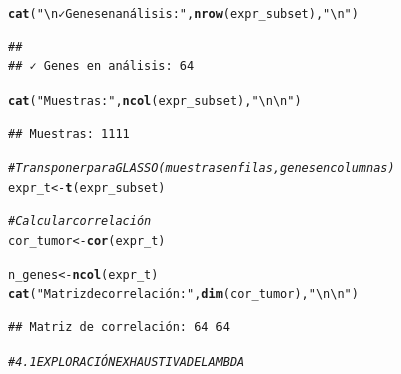 \documentclass{article}\usepackage[]{graphicx}\usepackage[]{xcolor}
\makeatletter
\newcommand{\hlsng}[1]{\textcolor[rgb]{0.192,0.494,0.8}{#1}}%
\newcommand{\hlcom}[1]{\textcolor[rgb]{0.678,0.584,0.686}{\textit{#1}}}%
\newcommand{\hldef}[1]{\textcolor[rgb]{0.345,0.345,0.345}{#1}}%
\newcommand{\hlkwb}[1]{\textcolor[rgb]{0.69,0.353,0.396}{#1}}%
\newcommand{\hlkwd}[1]{\textcolor[rgb]{0.737,0.353,0.396}{\textbf{#1}}}%
\newenvironment{kframe}{%
 \def\at@end@of@kframe{}%
 \ifinner\ifhmode%
  \def\at@end@of@kframe{\end{minipage}}%
  \begin{minipage}{\columnwidth}%
 \fi\fi%
 \def\FrameCommand##1{\hskip\@totalleftmargin \hskip-\fboxsep
 \colorbox{shadecolor}{##1}\hskip-\fboxsep
     \hskip-\linewidth \hskip-\@totalleftmargin \hskip\columnwidth}%
 \MakeFramed {\advance\hsize-\width
   \@totalleftmargin\z@ \linewidth\hsize
   \@setminipage}}%
 {\par\unskip\endMakeFramed%
 \at@end@of@kframe}
\newenvironment{knitrout}{}{} %
\makeatother
\begin{document}
\begin{knitrout}
\begin{kframe}
\begin{alltt}
\hlkwd{cat}\hldef{(}\hlsng{"\textbackslash{}n✓ Genes en análisis:"}\hldef{,} \hlkwd{nrow}\hldef{(expr_subset),} \hlsng{"\textbackslash{}n"}\hldef{)}
\end{alltt}
\begin{verbatim}
## 
## ✓ Genes en análisis: 64
\end{verbatim}
\begin{alltt}
\hlkwd{cat}\hldef{(}\hlsng{"Muestras:"}\hldef{,} \hlkwd{ncol}\hldef{(expr_subset),} \hlsng{"\textbackslash{}n\textbackslash{}n"}\hldef{)}
\end{alltt}
\begin{verbatim}
## Muestras: 1111
\end{verbatim}
\begin{alltt}
\hlcom{# Transponer para GLASSO (muestras en filas, genes en columnas)}
\hldef{expr_t} \hlkwb{<-} \hlkwd{t}\hldef{(expr_subset)}

\hlcom{# Calcular correlación}
\hldef{cor_tumor} \hlkwb{<-} \hlkwd{cor}\hldef{(expr_t)}

\hldef{n_genes} \hlkwb{<-} \hlkwd{ncol}\hldef{(expr_t)}
\hlkwd{cat}\hldef{(}\hlsng{"Matriz de correlación:"}\hldef{,} \hlkwd{dim}\hldef{(cor_tumor),} \hlsng{"\textbackslash{}n\textbackslash{}n"}\hldef{)}
\end{alltt}
\begin{verbatim}
## Matriz de correlación: 64 64
\end{verbatim}
\end{kframe}
\end{knitrout}
\begin{knitrout}
\color{fgcolor}\begin{kframe}
\begin{alltt}
\hlcom{# 4.1 EXPLORACIÓN EXHAUSTIVA DE LAMBDA}
\end{alltt}
\end{kframe}
\end{knitrout}
\end{document}
